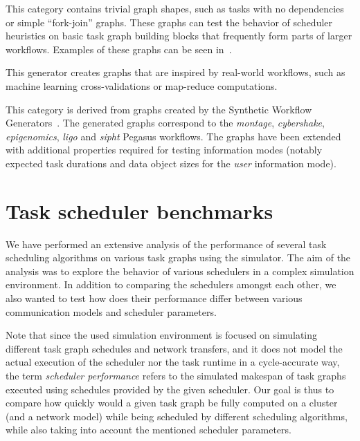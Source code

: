 \begin{description}[wide=0pt]
	\item[elementary] This category contains trivial graph shapes, such as tasks with no dependencies or simple
		``fork-join'' graphs. These graphs can test the behavior of scheduler heuristics on basic task
		graph building blocks that frequently form parts of larger workflows. Examples of these graphs can
		be seen in~.

	\item[irw] This generator creates graphs that are inspired by real-world workflows, such as machine learning
		cross-validations or map-reduce computations.

	\item[pegasus] This category is derived from graphs created by the Synthetic Workflow
		Generators~\cite{pegasusgraphs}. The generated graphs correspond to the \emph{montage},
		\emph{cybershake}, \emph{epigenomics}, \emph{ligo} and \emph{sipht}
		Pegasus workflows. The graphs have been extended with additional properties required for testing
		information modes (notably expected task durations and data object sizes for the
		\emph{user} information mode).
\end{description}

\section{Task scheduler benchmarks}
\label{sec:estee-benchmarks}
We have performed an extensive analysis of the performance of several task scheduling algorithms on
various task graphs using the \estee{} simulator. The aim of the analysis was to
explore the behavior of various schedulers in a complex simulation environment. In addition to
comparing the schedulers amongst each other, we also wanted to test how does their performance
differ between various communication models and scheduler parameters.

Note that since the used simulation environment is focused on simulating different task graph
schedules and network transfers, and it does not model the actual execution of the scheduler nor
the task runtime in a cycle-accurate way, the term \emph{scheduler performance} refers to the simulated
makespan of task graphs executed using schedules provided by the given scheduler. Our goal is thus
to compare how quickly would a given task graph be fully computed on a cluster (and a network
model) while being scheduled by different scheduling algorithms, while also taking into account the
mentioned scheduler parameters.

